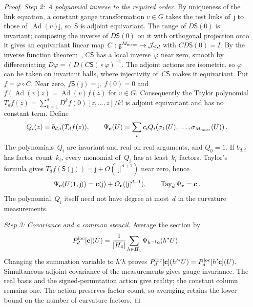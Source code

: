 \begin{proof}
\emph{Step 2: A polynomial inverse to the required order.} By uniqueness of the link equation, a constant gauge transformation $v\in G$ takes the test links of~$\mathsf j$ to those of~$\operatorname{Ad}(v)\mathsf j$, so~$\mathsf S$ is adjoint equivariant. The range of $D\mathsf S(0)$ is invariant; composing the inverse of $D\mathsf S(0)$ on it with orthogonal projection onto it gives an equivariant linear map $C:\mathfrak{g}^{M_{\rm meas}}\to\mathcal J_{\le d}$ with $CD\mathsf S(0)=I$. By the inverse function theorem~\cite[Theorem~9.24]{Rudin1976}, $C\mathsf S$ has a local inverse~$\varphi$ near zero, smooth by differentiating $D\varphi=(D(C\mathsf S)\circ\varphi)^{-1}$. The adjoint actions are isometric, so $\varphi$ can be taken on invariant balls, where injectivity of~$C\mathsf S$ makes it equivariant. Put $f=\varphi\circ C$. Near zero, $f\mathsf S(\mathsf j)=\mathsf j$, $f(0)=0$ and $f(\operatorname{Ad}(v)z)=\operatorname{Ad}(v)f(z)$ for $v\in G$. Consequently the Taylor polynomial $T_df(z)=\sum_{k=1}^{d}D^kf(0)[z,\ldots,z]/k!$ is adjoint equivariant and has no constant term. Define
\begin{equation*}
Q_i(z)=b_{d,i}(T_df(z)),\qquad
\Psi_{\mathbf c}(U)=\sum_i c_iQ_i(\sigma_1(U),\ldots,\sigma_{M_{\rm meas}}(U))\,.
\end{equation*}
The polynomials~$Q_i$ are invariant and real on real arguments, and $Q_0=1$. If $b_{d,i}$ has factor count~$k_i$, every monomial of~$Q_i$ has at least~$k_i$ factors. Taylor's formula gives $T_df(\mathsf S(\mathsf j))=\mathsf j+O(|\mathsf j|^{d+1})$ near zero, hence
\begin{equation*}
\Psi_{\mathbf c}(U(1,\mathsf j))=\mathbf c(\mathsf j)+O_{\mathbf c}(|\mathsf j|^{d+1}),\qquad
\operatorname{Tay}_{d}\Psi_{\mathbf c}=\mathbf c\,.
\end{equation*}
The polynomial~$Q_i$ itself need not have degree at most~$d$ in the curvature measurements.

\emph{Step 3: Covariance and a common stencil.} Average the section by
\begin{equation}\label{eq:A-average}
P_{d}^{\mathrm{loc}}[\mathbf c](U)=\frac1{|H_4|}
\sum_{h\in H_4}\Psi_{h^{-1}\mathbf c}(h^*U)\,.
\end{equation}
Changing the summation variable to $h'h$ proves $P_{d}^{\mathrm{loc}}[\mathbf c](h'^*U)=P_{d}^{\mathrm{loc}}[h'\mathbf c](U)$. Simultaneous adjoint covariance of the measurements gives gauge invariance. The real basis and the signed-permutation action give reality; the constant column remains one. The action preserves factor count, so averaging retains the lower bound on the number of curvature factors.


\end{proof}
